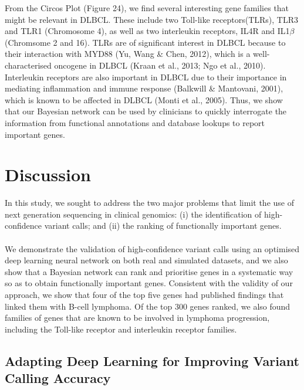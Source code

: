 \documentclass{article}
\begin{document}
From the Circos Plot (Figure 24), we find several interesting gene families that might be relevant in DLBCL. These include two Toll-like receptors(TLRs), TLR3 and TLR1 (Chromosome 4), as well as two interleukin receptors, IL4R and IL1$\beta$ (Chromsome 2 and 16). TLRs are of significant interest in DLBCL because to their interaction with MYD88 (Yu, Wang \& Chen, 2012), which is a well-characterised oncogene in DLBCL (Kraan et al., 2013; Ngo et al., 2010). Interleukin receptors are also important in DLBCL due to their importance in mediating inflammation and immune response (Balkwill \& Mantovani, 2001), which is known to be affected in DLBCL (Monti et al., 2005). Thus, we show that our Bayesian network can be used by clinicians to quickly interrogate the information from functional annotations and database lookups to report important genes.

\newpage
\section{Discussion}
In this study, we sought to address the two major problems that limit the use of next generation sequencing in clinical genomics: (i) the identification of high-confidence variant calls; and (ii) the ranking of functionally important genes.\\\\
We demonstrate the validation of high-confidence variant calls using an optimised deep learning neural network on both real and simulated datasets, and we also show that a Bayesian network can rank and prioritise genes in a systematic way so as to obtain functionally important genes. Consistent with the validity of our approach, we show that four of the top five genes had published findings that linked them with B-cell lymphoma. Of the top 300 genes ranked, we also found families of genes that are known to be involved in lymphoma progression, including the Toll-like receptor and interleukin receptor families. 







\subsection{Adapting Deep Learning for Improving Variant Calling Accuracy}
\end{document}

